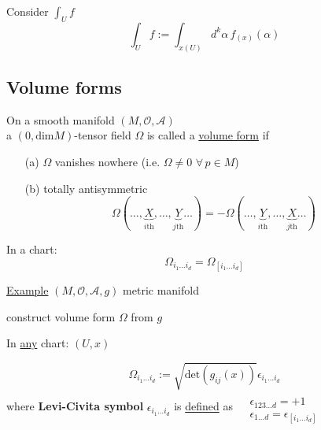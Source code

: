 
Consider $\int_U f$
\[
\int_U f := \int_{x(U)} d^k\alpha \, f_{(x)}(\alpha)
\]
\subsection{Volume forms}

\begin{definition}
On a smooth manifold $(M,\mathcal{O},\mathcal{A})$ \\
a $(0,\text{dim}M)$-tensor field $\Omega$ is called a \underline{volume form} if 
\begin{enumerate}
\item[(a)] $\Omega$ vanishes nowhere (i.e. $\Omega \neq 0 \, \, \forall \, p \in M$) 
\item[(b)] totally antisymmetric 
\[
\Omega(\dots , \underbrace{X}_{i\text{th}} , \dots , \underbrace{Y}_{j\text{th}} \dots ) = - \Omega(\dots , \underbrace{Y}_{i\text{th}} , \dots , \underbrace{X}_{j\text{th}} \dots )
\]
\end{enumerate}

In a chart: 
\[
\Omega_{i_1 \dots i_d} = \Omega_{ [i_1 \dots i_d ]}
\]
\end{definition}

\underline{Example} $(M,\mathcal{O}, \mathcal{A},g)$ metric manifold

construct volume form $\Omega$ from $g$

In \underline{any} chart: $(U,x)$

\[
\Omega_{i_1 \dots i_d} := \sqrt{ \text{det}(g_{ij}(x)) } \epsilon_{i_1 \dots i_d} 
\]
where \textbf{Levi-Civita symbol} $\epsilon_{i_1 \dots i_d}$ is \underline{defined} as $\begin{aligned} & \quad \\ 
& \epsilon_{123 \dots d} = +1 \\ 
& \epsilon_{1\dots d} = \epsilon_{[i_1 \dots i_d]} \end{aligned}$

